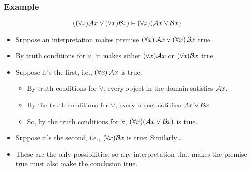 \begin{frame}
  \frametitle{Example}

  \[((\forall x)\mathcal{A}x \vee (\forall x)\mathcal{B}x) \vDash (\forall x)(\mathcal{A}x \vee \mathcal{B}x)\]
  \begin{itemize}[<+->]
  \item Suppose an interpretation makes premise $(\forall x)\,\mathcal{A}x
  \vee (\forall x)\,\mathcal{B}x$ true.
  \item By truth conditions for $\lor$, it makes either $(\forall x)\mathcal{A}x$ or $(\forall x)\mathcal{B}x$ true.
  \item Suppose it's the first, i.e., $(\forall x)\,\mathcal{A}x$ is true.
    \begin{itemize}[<+->]
      \item By truth conditions for $\forall$, every object in the domain satisfies $\mathcal{A}x$.
      \item By the truth conditions for $\lor$, every object satisfies $\mathcal{A}x \vee \mathcal{B}x$
      \item So, by the truth conditions for $\forall$, $(\forall x)(\mathcal{A}x
      \vee \mathcal{B}x)$ is true.
    \end{itemize}
  \item Suppose it's the second, i.e., $(\forall x)\mathcal{B}x$ is true: Similarly\dots
  \item These are the only possibilities: so any interpretation that makes the premise true must also make the conclusion true.
  \end{itemize}
\end{frame}






